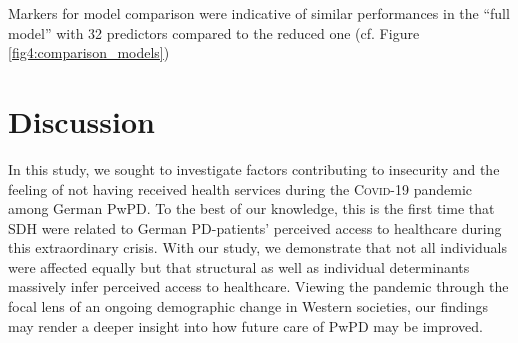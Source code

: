 \documentclass[a4paper,oneside,11pt,english]{scrartcl}
\begin{document}
\begin{table}[ht]
	\caption{Significant factors contibuting to unmet care needs during \textsc{Covid}-19 pandemic according to the reduced \textsc{GLM}:}
	\label{tab2:reduced_model}
	\centering
\end{table}	 

Markers for model comparison were indicative of similar performances in the ``full model'' with 32 predictors compared to the reduced one (cf. Figure \ref{fig4:comparison_models})


\newpage


\section*{Discussion}
In this study, we sought to investigate factors contributing to insecurity and the feeling of not having received health services during the \textsc{Covid}-19 pandemic among German Pw\textsc{PD}. To the best of our knowledge, this is the first time that SDH were related to German \textsc{PD}-patients' perceived access to healthcare during this extraordinary crisis. With our study, we demonstrate that not all individuals were affected equally but that structural as well as individual determinants massively infer perceived access to healthcare. Viewing the pandemic through the focal lens of an ongoing demographic change in Western societies, our findings may render a deeper insight into how future care of Pw\textsc{PD} may be improved. 
\end{document}
